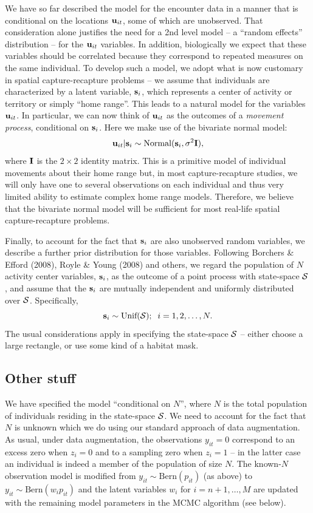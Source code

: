 We have so far described the model for the encounter data in a manner
that is conditional on the locations ${\bf u}_{it}$, some of which are
unobserved. That consideration alone justifies the need for a 2nd
level model -- a ``random effects'' distribution -- for the ${\bf
  u}_{it}$ variables. In addition, biologically we expect that these
variables should be correlated because they correspond to repeated
measures on the same individual.  To develop such a model, we adopt
what is now customary in spatial capture-recapture problems -- we
assume that individuals are characterized by a latent variable, ${\bf
  s}_{i}$, which represents a center of activity or territory or
simply ``home range''. This leads to a natural model for the variables
${\bf u}_{it}$. In particular, we can now think of ${\bf u}_{it}$ as
the outcomes of a {\it movement process}, conditional on ${\bf
  s}_{i}$. Here we make use of the bivariate normal model:
\[
 {\bf u}_{it} | {\bf s}_{i} \sim \mbox{Normal}({\bf s}_{i}, \sigma^{2}{\bf I}),
\]
where ${\bf I}$ is the $2\times 2$ identity matrix.  This is a
primitive model of individual movements about their home range but, in
most capture-recapture studies, we will only have one to several
observations on each individual and thus very limited ability to
estimate complex home range models. Therefore, we believe that the
bivariate normal model will be sufficient for most real-life spatial
capture-recapture problems.

Finally, to account for the fact that ${\bf s}_{i}$ are also
unobserved random variables, we describe a further prior distribution
for those variables. Following Borchers \& Efford (2008), Royle \&
Young (2008) and others, we regard the population of $N$ activity
center variables, ${\bf s}_{i}$, as the outcome of a point process
with state-space ${\cal S}$, and assume that the ${\bf s}_{i}$ are
mutually independent and uniformly distributed over ${\cal
  S}$. Specifically,
\[
 {\bf s}_{i} \sim \mbox{Unif}({\cal S}); \; \; i=1,2,\ldots,N.
\]
The usual considerations apply in specifying the state-space ${\cal
  S}$ -- either choose a large rectangle, or use some kind of a
habitat mask.




\subsection{Other stuff}

We have specified the model ``conditional on $N$'', where $N$
is the total population of individuals residing in the state-space
${\cal S}$. We need to account for the fact that $N$ is unknown which
we do using our standard approach of data augmentation. 
As usual, under data augmentation, the
observations $y_{it}=0$
correspond to an excess zero when $z_{i}=0$ and to a sampling
zero when $z_{i}=1$ -- in the latter case an
individual is indeed a member of the population of size $N$. The known-$N$ observation model is
modified from $y_{it} \sim \mbox{Bern}(p_{it})$ (as above) to $y_{it}
\sim \mbox{Bern}(w_{i} p_{it})$ and the latent variables $w_{i}$ for
$i=n+1,\ldots,M$ are updated with the remaining model parameters in
the MCMC algorithm (see below). 


